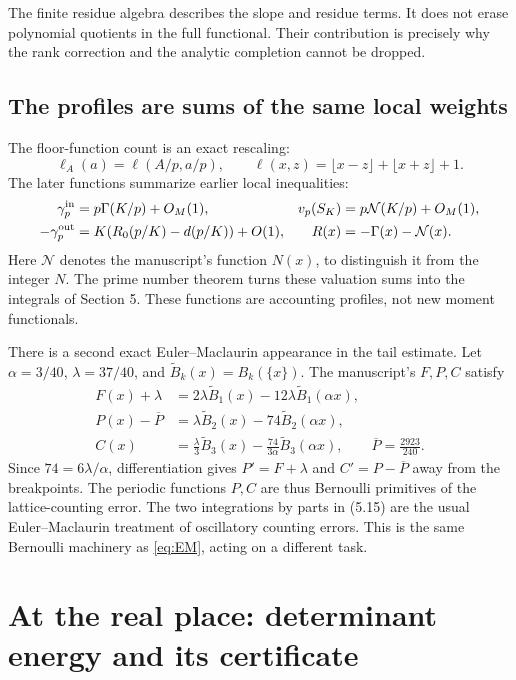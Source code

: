 \documentclass[11pt]{article}
\theoremstyle{definition}
\theoremstyle{remark}\newtheorem*{remark}{Remark}
\newcommand{\Btil}{\widetilde B}
\begin{document}
The finite residue algebra describes the slope and residue terms. It does not
erase polynomial quotients in the full functional. Their contribution is
precisely why the rank correction and the analytic completion cannot be dropped.

\subsection{The profiles are sums of the same local weights}
The floor-function count is an exact rescaling:
\[
 \ell_A(a)=\ell(A/p,a/p),\qquad
 \ell(x,z)=\lfloor x-z\rfloor+\lfloor x+z\rfloor+1.
\]
The later functions summarize earlier local inequalities:
\begin{align*}
 \gamma_p^{\rm in}&=p\Gamma(K/p)+O_M(1),&
 v_p(S_K)&=p\mathcal N(K/p)+O_M(1),\\
 -\gamma_p^{\rm out}&=K(R_0(p/K)-d(p/K))+O(1),&
 R(x)&=-\Gamma(x)-\mathcal N(x).
\end{align*}
Here $\mathcal N$ denotes the manuscript's function $N(x)$, to distinguish it
from the integer $N$. The prime number theorem turns these valuation sums
into the integrals of Section 5. These functions are accounting profiles,
not new moment functionals.

There is a second exact Euler--Maclaurin appearance in the tail estimate.
Let $\alpha=3/40$, $\lambda=37/40$, and
$\Btil_k(x)=B_k(\{x\})$. The manuscript's $F,P,C$ satisfy
\begin{align}
 F(x)+\lambda&=2\lambda\Btil_1(x)-12\lambda\Btil_1(\alpha x),\label{eq:tail1}\\
 P(x)-\overline P&=\lambda\Btil_2(x)-74\Btil_2(\alpha x),\label{eq:tail2}\\
 C(x)&=\frac\lambda3\Btil_3(x)-\frac{74}{3\alpha}\Btil_3(\alpha x),
 \qquad \overline P=\frac{2923}{240}.\label{eq:tail3}
\end{align}
Since $74=6\lambda/\alpha$, differentiation gives $P'=F+\lambda$ and
$C'=P-\overline P$ away from the breakpoints. The periodic functions $P,C$
are thus Bernoulli primitives of the lattice-counting error. The two
integrations by parts in (5.15) are the usual Euler--Maclaurin treatment of
oscillatory counting errors. This is the same Bernoulli machinery as
\eqref{eq:EM}, acting on a different task.

\section{At the real place: determinant energy and its certificate}
\end{document}
